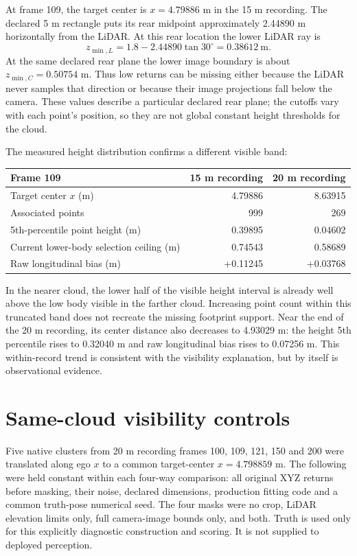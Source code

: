 \documentclass[11pt]{article}
\begin{document}
At frame 109, the target center is $x=4.79886$ m in the 15 m recording.
The declared 5 m rectangle puts its rear midpoint approximately 2.44890 m
horizontally from the LiDAR. At this rear location the lower LiDAR ray is
\[
 z_{\min,L}=1.8-2.44890\tan30^\circ=0.38612\ \mathrm{m}.
\]
At the same declared rear plane the lower image boundary is about
$z_{\min,C}=0.50754$ m. Thus low returns can be missing either because the
LiDAR never samples that direction or because their image projections fall
below the camera. These values describe a particular declared rear plane;
the cutoffs vary with each point's position, so they are not global constant
height thresholds for the cloud.

The measured height distribution confirms a different visible band:
\begin{center}\small
\begin{tabular}{@{}lrr@{}}\toprule
Frame 109 & 15 m recording & 20 m recording \\\midrule
Target center $x$ (m) & 4.79886 & 8.63915 \\
Associated points & 999 & 269 \\
5th-percentile point height (m) & 0.39895 & 0.04602 \\
Current lower-body selection ceiling (m) & 0.74543 & 0.58689 \\
Raw longitudinal bias (m) & +0.11245 & +0.03768 \\
\bottomrule\end{tabular}
\end{center}
In the nearer cloud, the lower half of the visible height interval is already
well above the low body visible in the farther cloud. Increasing point count
within this truncated band does not recreate the missing footprint support.
Near the end of the 20 m recording, its center distance also decreases to
4.93029 m: the height 5th percentile rises to 0.32040 m and raw longitudinal
bias rises to 0.07256 m. This within-record trend is consistent with the
visibility explanation, but by itself is observational evidence.

\section{Same-cloud visibility controls}
Five native clusters from 20 m recording frames 100, 109, 121, 150 and 200
were translated along ego $x$ to a common target-center $x=4.798859$ m.
The following were held constant within each four-way comparison: all original
XYZ returns before masking, their noise, declared dimensions, production
fitting code and a common truth-pose numerical seed. The four masks were
no crop, LiDAR elevation limits only, full camera-image bounds only, and both.
Truth is used only for this explicitly diagnostic construction and scoring.
It is not supplied to deployed perception.
\end{document}

